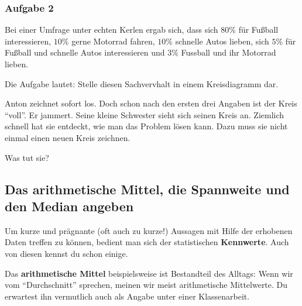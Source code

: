 \documentclass[
  ngerman,
]{book}
\begin{document}
\hypertarget{aufgabe-2-2}{%
\subsubsection*{Aufgabe 2}\label{aufgabe-2-2}}

Bei einer Umfrage unter echten Kerlen ergab sich, dass sich \(80\%\) für Fußball interessieren, \(10\%\) gerne Motorrad fahren, \(10\%\) schnelle Autos lieben, sich \(5\%\) für Fußball und schnelle Autos interessieren und \(3\%\) Fussball und ihr Motorrad lieben.

Die Aufgabe lautet: Stelle diesen Sachvervhalt in einem Kreisdiagramm dar.

Anton zeichnet sofort los. Doch schon nach den ersten drei Angaben ist der Kreis ``voll''. Er jammert. Seine kleine Schwester sieht sich seinen Kreis an. Ziemlich schnell hat sie entdeckt, wie man das Problem lösen kann. Dazu muss sie nicht einmal einen neuen Kreis zeichnen.

Was tut sie?

\hypertarget{section-14}{%
\subsubsection*{}\label{section-14}}

\hypertarget{section-15}{%
\subsubsection*{}\label{section-15}}

\hypertarget{das-arithmetische-mittel-die-spannweite-und-den-median-angeben}{%
\subsection*{Das arithmetische Mittel, die Spannweite und den Median angeben}\label{das-arithmetische-mittel-die-spannweite-und-den-median-angeben}}

Um kurze und prägnante (oft auch zu kurze!) Aussagen mit Hilfe der erhobenen Daten treffen zu können, bedient man sich der statistischen \textbf{Kennwerte}. Auch von diesen kennst du schon einige.

Das \textbf{arithmetische Mittel} beispielsweise ist Bestandteil des Alltags: Wenn wir vom ``Durchschnitt'' sprechen, meinen wir meist arithmetische Mittelwerte. Du erwartest ihn vermutlich auch als Angabe unter einer Klassenarbeit.
\end{document}
